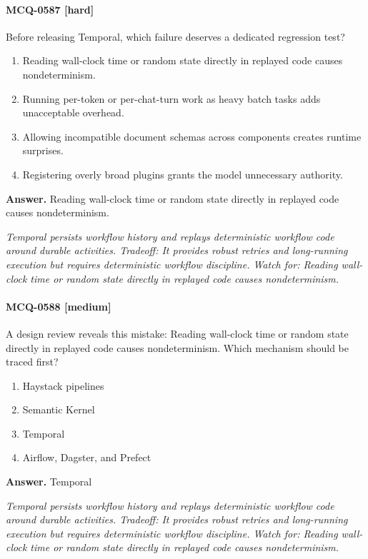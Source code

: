 \paragraph{MCQ-0587 [hard]} Before releasing Temporal, which failure deserves a dedicated regression test?
\begin{enumerate}[label=\Alph*.]
\item Reading wall-clock time or random state directly in replayed code causes nondeterminism.
\item Running per-token or per-chat-turn work as heavy batch tasks adds unacceptable overhead.
\item Allowing incompatible document schemas across components creates runtime surprises.
\item Registering overly broad plugins grants the model unnecessary authority.
\end{enumerate}
\noindent\textbf{Answer.} Reading wall-clock time or random state directly in replayed code causes nondeterminism.
\par\textit{Temporal persists workflow history and replays deterministic workflow code around durable activities. Tradeoff: It provides robust retries and long-running execution but requires deterministic workflow discipline. Watch for: Reading wall-clock time or random state directly in replayed code causes nondeterminism.}
\paragraph{MCQ-0588 [medium]} A design review reveals this mistake: Reading wall-clock time or random state directly in replayed code causes nondeterminism. Which mechanism should be traced first?
\begin{enumerate}[label=\Alph*.]
\item Haystack pipelines
\item Semantic Kernel
\item Temporal
\item Airflow, Dagster, and Prefect
\end{enumerate}
\noindent\textbf{Answer.} Temporal
\par\textit{Temporal persists workflow history and replays deterministic workflow code around durable activities. Tradeoff: It provides robust retries and long-running execution but requires deterministic workflow discipline. Watch for: Reading wall-clock time or random state directly in replayed code causes nondeterminism.}
